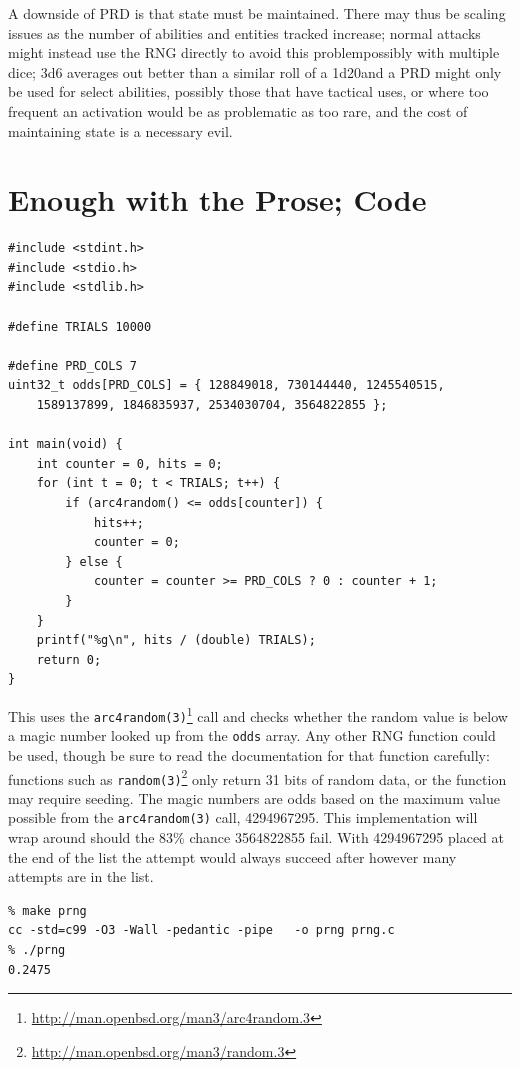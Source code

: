 \documentclass[12pt,a4paper]{article}
\begin{document}
A downside of PRD is that state must be maintained. There may thus be
scaling issues as the number of abilities and entities tracked increase;
normal attacks might instead use the RNG directly to avoid this
problem\textendash possibly with multiple dice; 3d6 averages out better than a
similar roll of a 1d20\textendash and a PRD might only be used for select
abilities, possibly those that have tactical uses, or where too frequent
an activation would be as problematic as too rare, and the cost of
maintaining state is a necessary evil.

\section*{Enough with the Prose; Code}

\begin{verbatim}
#include <stdint.h>
#include <stdio.h>
#include <stdlib.h>

#define TRIALS 10000

#define PRD_COLS 7
uint32_t odds[PRD_COLS] = { 128849018, 730144440, 1245540515,
    1589137899, 1846835937, 2534030704, 3564822855 };

int main(void) {
    int counter = 0, hits = 0;
    for (int t = 0; t < TRIALS; t++) {
        if (arc4random() <= odds[counter]) {
            hits++;
            counter = 0;
        } else {
            counter = counter >= PRD_COLS ? 0 : counter + 1;
        }
    }
    printf("%g\n", hits / (double) TRIALS);
    return 0;
}
\end{verbatim}

This uses the
\texttt{arc4random(3)}\footnote{\url{http://man.openbsd.org/man3/arc4random.3}}
call and checks whether the random value is below a magic number looked
up from the \texttt{odds} array. Any other RNG function could be used,
though be sure to read the documentation for that function carefully:
functions such as
\texttt{random(3)}\footnote{\url{http://man.openbsd.org/man3/random.3}}
only return 31 bits of random data, or the function may require seeding.
The magic numbers are odds based on the maximum value possible from the
\texttt{arc4random(3)} call, 4294967295. This implementation will wrap
around should the 83\% chance 3564822855 fail. With 4294967295 placed at
the end of the list the attempt would always succeed after however many
attempts are in the list.

\begin{verbatim}
% make prng                            
cc -std=c99 -O3 -Wall -pedantic -pipe   -o prng prng.c 
% ./prng 
0.2475
\end{verbatim}
\end{document}
